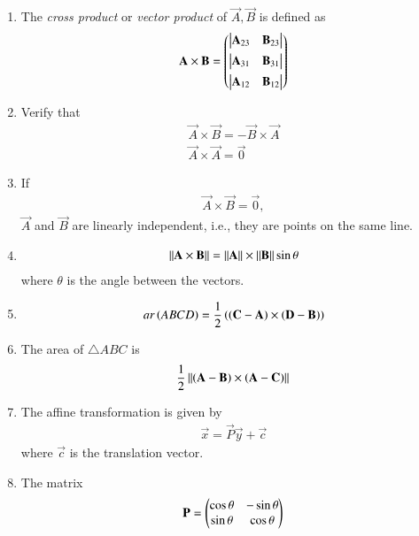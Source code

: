 \begin{enumerate}[label=\thesubsection.\arabic*.,ref=\thesubsection.\theenumi]
\item The {\em cross product} or {\em vector product} of $\vec{A}, \vec{B}$ is defined as
\begin{align}
  \label{eq:cross3d}
	\mathbf{A} \times \mathbf{B} 
	 = \begin{pmatrix} \begin{vmatrix}\mathbf{A}_{23} & \mathbf{B}_{23}\end{vmatrix} \\[1ex] \begin{vmatrix}\mathbf{A}_{31} & \mathbf{B}_{31}\end{vmatrix} \\[1ex] \begin{vmatrix}\mathbf{A}_{12}  & \mathbf{B}_{12}\end{vmatrix}\end{pmatrix}
\end{align}
\item Verify that
\begin{align}
  \label{eq:cross3d-commute}
  \vec{A} \times \vec{B} = -  \vec{B} \times \vec{A} 
  \\
  \label{eq:cross3d-same}
  \vec{A} \times \vec{A} = \vec{0}
\end{align}
\item If 
		\label{prop:lin-dep-cross}
\begin{align}
  \vec{A} \times \vec{B} = \vec{0},
\end{align}
  $\vec{A}$ and $ \vec{B} $ are linearly independent, i.e., they are points on the same line.
  \item 
\begin{align}
	\label{eq:cross-sin}
	\left\lVert \mathbf{A} \times \mathbf{B} \right\rVert
	=
	\left\lVert\mathbf{A}\right\rVert \times 	\left\lVert\mathbf{B}\right\rVert \sin \theta
\end{align}
where $\theta$ is the angle between the vectors.
\item 
\begin{align}
	ar\left(ABCD\right) = 
         \frac{1}{2}\left(\left(\mathbf{C}-\mathbf{A}\right)\times\left(\mathbf{D}-\mathbf{B}\right)\right) \\
        \label{eq:11/10/1/1area-diag} 
\end{align}
\item The area of $\triangle ABC$ is 
		\begin{align}
			\label{eq:tri-area-cross}
			\frac{1}{2}\left\lVert{\ensuremath{\left(\mathbf{A}-\mathbf{B}\right)}\times \ensuremath{\left(\mathbf{A}-\mathbf{C}\right)}}\right\rVert
		\end{align}
	\item 
The affine transformation is given by 
\begin{align}
	\label{eq:conic_affine}
	\vec{x} = \vec{P}\vec{y}+\vec{c}
\end{align}
where $\vec{c}$ is the translation vector.
\item The matrix
\begin{align}
\mathbf{P} =
\begin{pmatrix}
\cos\theta & -\sin\theta \\
\sin\theta & \cos\theta 
\end{pmatrix}
\end{align}
\end{enumerate}
